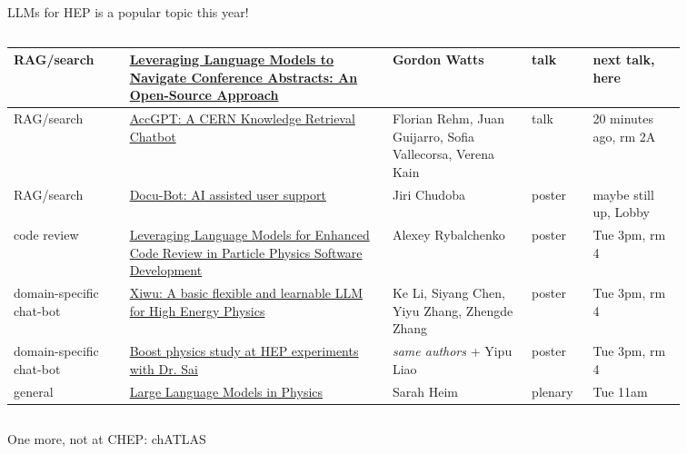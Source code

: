 \documentclass[aspectratio=169]{beamer}
\begin{document}
\begin{frame}{LLMs for HEP is a popular topic this year!}
\small
\vspace{0.25 cm}
\begin{columns}
\renewcommand{\arraystretch}{1.04}
\begin{tabular}{C{0.15\linewidth} L{0.34\linewidth} L{0.18\linewidth} C{0.07\linewidth} C{0.12\linewidth}}
RAG/search & \textcolor{blue}{\href{https://indico.cern.ch/event/1338689/contributions/6011147/}{Leveraging Language Models to Navigate Conference Abstracts: An Open-Source Approach}} & Gordon Watts & talk & next talk, here \\\hline
RAG/search & \textcolor{blue}{\href{https://indico.cern.ch/event/1338689/contributions/6010661/}{AccGPT: A CERN Knowledge Retrieval Chatbot}} & Florian Rehm, Juan Guijarro, Sofia Vallecorsa, Verena Kain & talk & 20 minutes ago, rm 2A \\\hline
RAG/search & \textcolor{blue}{\href{https://indico.cern.ch/event/1338689/contributions/6010735/}{Docu-Bot: AI assisted user support}} & Jiri Chudoba & poster & maybe still up, Lobby \\\hline
code review & \textcolor{blue}{\href{https://indico.cern.ch/event/1338689/contributions/6010676/}{Leveraging Language Models for Enhanced Code Review in Particle Physics Software Development}} & Alexey Rybalchenko & poster & Tue 3pm, rm 4 \\\hline
domain-specific chat-bot & \textcolor{blue}{\href{https://indico.cern.ch/event/1338689/contributions/6010731/}{Xiwu: A basic flexible and learnable LLM for High Energy Physics}} & Ke Li, Siyang Chen, Yiyu Zhang, Zhengde Zhang & poster & Tue 3pm, rm 4 \\\hline
domain-specific chat-bot & \textcolor{blue}{\href{https://indico.cern.ch/event/1338689/contributions/6010732/}{Boost physics study at HEP experiments with Dr. Sai}} & {\it same authors} + Yipu Liao & poster & Tue 3pm, rm 4 \\\hline
general & \textcolor{blue}{\href{https://indico.cern.ch/event/1338689/contributions/6066662/}{Large Language Models in Physics}} & Sarah Heim & plenary & Tue 11am \\
\end{tabular}
\end{columns}
\end{frame}

\begin{frame}{One more, not at CHEP: chATLAS}
\vspace{0.2 cm}
\begin{center}
\end{center}
\end{frame}
\end{document}
